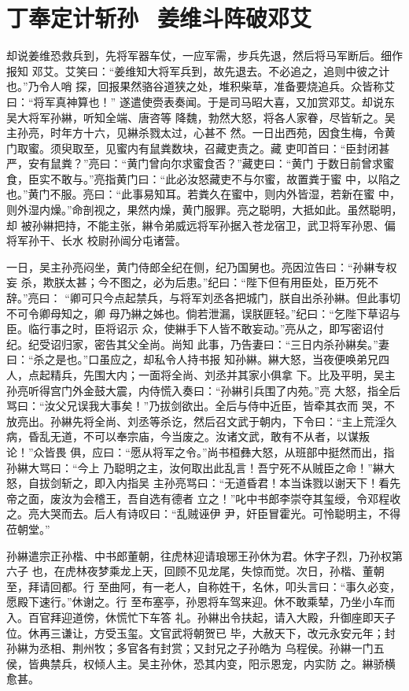 \chapter{丁奉定计斩孙~姜维斗阵破邓艾}

却说姜维恐救兵到，先将军器车仗，一应军需，步兵先退，然后将马军断后。细作报知
邓艾。艾笑曰：“姜维知大将军兵到，故先退去。不必追之，追则中彼之计也。”乃令人哨
探，回报果然骆谷道狭之处，堆积柴草，准备要烧追兵。众皆称艾曰：“将军真神算也！”
遂遣使赍表奏闻。于是司马昭大喜，又加赏邓艾。却说东吴大将军孙綝，听知全端、唐咨等
降魏，勃然大怒，将各人家眷，尽皆斩之。吴主孙亮，时年方十六，见綝杀戮太过，心甚不
然。一日出西苑，因食生梅，令黄门取蜜。须臾取至，见蜜内有鼠粪数块，召藏吏责之。藏
吏叩首曰：“臣封闭甚严，安有鼠粪？”亮曰：“黄门曾向尔求蜜食否？”藏吏曰：“黄门
于数日前曾求蜜食，臣实不敢与。”亮指黄门曰：“此必汝怒藏吏不与尔蜜，故置粪于蜜
中，以陷之也。”黄门不服。亮曰：“此事易知耳。若粪久在蜜中，则内外皆湿，若新在蜜
中，则外湿内燥。”命剖视之，果然内燥，黄门服罪。亮之聪明，大抵如此。虽然聪明，却
被孙綝把持，不能主张，綝令弟威远将军孙据入苍龙宿卫，武卫将军孙恩、偏将军孙干、长水
校尉孙闿分屯诸营。

一日，吴主孙亮闷坐，黄门侍郎全纪在侧，纪乃国舅也。亮因泣告曰：“孙綝专权妄
杀，欺朕太甚；今不图之，必为后患。”纪曰：“陛下但有用臣处，臣万死不辞。”亮曰：
“卿可只今点起禁兵，与将军刘丞各把城门，朕自出杀孙綝。但此事切不可令卿母知之，卿
母乃綝之姊也。倘若泄漏，误朕匪轻。”纪曰：“乞陛下草诏与臣。临行事之时，臣将诏示
众，使綝手下人皆不敢妄动。”亮从之，即写密诏付纪。纪受诏归家，密告其父全尚。尚知
此事，乃告妻曰：“三日内杀孙綝矣。”妻曰：“杀之是也。”口虽应之，却私令人持书报
知孙綝。綝大怒，当夜便唤弟兄四人，点起精兵，先围大内；一面将全尚、刘丞并其家小俱拿
下。比及平明，吴主孙亮听得宫门外金鼓大震，内侍慌入奏曰：“孙綝引兵围了内苑。”亮
大怒，指全后骂曰：“汝父兄误我大事矣！”乃拔剑欲出。全后与侍中近臣，皆牵其衣而
哭，不放亮出。孙綝先将全尚、刘丞等杀讫，然后召文武于朝内，下令曰：“主上荒淫久
病，昏乱无道，不可以奉宗庙，今当废之。汝诸文武，敢有不从者，以谋叛论！”众皆畏
俱，应曰：“愿从将军之令。”尚书桓彝大怒，从班部中挺然而出，指孙綝大骂曰：“今上
乃聪明之主，汝何取出此乱言！吾宁死不从贼臣之命！”綝大怒，自拔剑斩之，即入内指吴
主孙亮骂曰：“无道昏君！本当诛戮以谢天下！看先帝之面，废汝为会稽王，吾自选有德者
立之！”叱中书郎李崇夺其玺绶，令邓程收之。亮大哭而去。后人有诗叹曰：“乱贼诬伊
尹，奸臣冒霍光。可怜聪明主，不得莅朝堂。”

孙綝遣宗正孙楷、中书郎董朝，往虎林迎请琅琊王孙休为君。休字子烈，乃孙权第六子
也，在虎林夜梦乘龙上天，回顾不见龙尾，失惊而觉。次日，孙楷、董朝至，拜请回都。行
至曲阿，有一老人，自称姓干，名休，叩头言曰：“事久必变，愿殿下速行。”休谢之。行
至布塞亭，孙恩将车驾来迎。休不敢乘辇，乃坐小车而入。百官拜迎道傍，休慌忙下车答
礼。孙綝出令扶起，请入大殿，升御座即天子位。休再三谦让，方受玉玺。文官武将朝贺已
毕，大赦天下，改元永安元年；封孙綝为丞相、荆州牧；多官各有封赏；又封兄之子孙皓为
乌程侯。孙綝一门五侯，皆典禁兵，权倾人主。吴主孙休，恐其内变，阳示恩宠，内实防
之。綝骄横愈甚。


